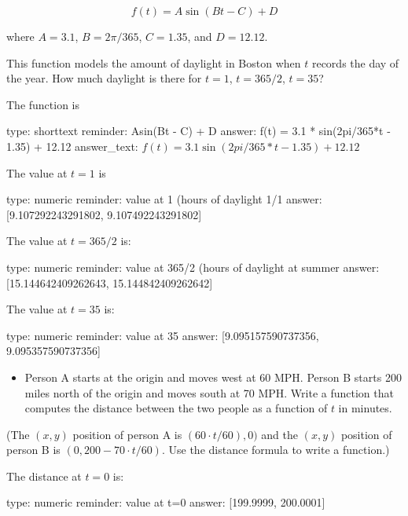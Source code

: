 \documentclass[12pt]{article}
\begin{document}
\[
f(t) = A\sin(Bt - C) + D
\]

where $A=3.1$, $B=2\pi/365$, $C=1.35$, and $D=12.12$.

This function models the amount of daylight in Boston when $t$ records
the day of the year. How much daylight is there for $t=1$, $t=365/2$,
$t = 35$?

The function is

\begin{answer}
type: shorttext
reminder: Asin(Bt - C) + D
answer: f(t) = 3.1 * sin(2pi/365*t - 1.35) + 12.12
answer_text: \( f(t) = 3.1\sin(2pi/365*t - 1.35) + 12.12 \) 
\end{answer}

The value at $t=1$ is

\begin{answer}
    type: numeric
    reminder: value at 1 (hours of daylight 1/1
    answer: [9.107292243291802, 9.107492243291802]

\end{answer}

The value at $t=365/2$ is:

\begin{answer}
    type: numeric
    reminder: value at 365/2 (hours of daylight at summer
    answer: [15.144642409262643, 15.144842409262642]

\end{answer}

The value at $t=35$ is:

\begin{answer}
    type: numeric
    reminder: value at 35
    answer: [9.095157590737356, 9.095357590737356]

\end{answer}

\begin{itemize}
\itemsep1pt\parskip0pt
\item
  Person A starts at the origin and moves west at 60 MPH. Person B
  starts 200 miles north of the origin and moves south at 70 MPH. Write
  a function that computes the distance between the two people as a
  function of $t$ in minutes.
\end{itemize}

(The $(x,y)$ position of person A is $(60\cdot t/60), 0)$ and the
$(x,y)$ position of person B is $(0, 200 - 70 \cdot t/60)$. Use the
distance formula to write a function.)

The distance at $t=0$ is:

\begin{answer}
    type: numeric
    reminder: value at t=0
    answer: [199.9999, 200.0001]

\end{answer}
\end{document}
